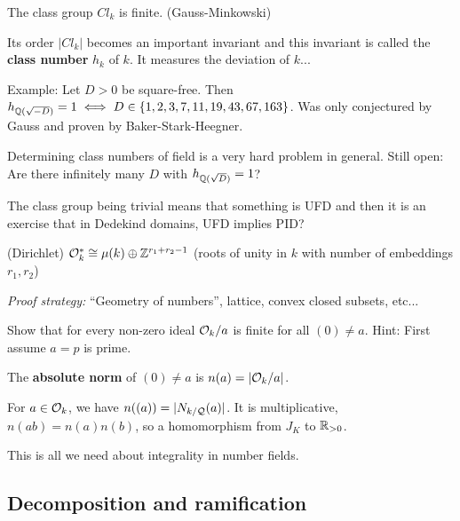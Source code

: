 \begin{outline}
\0 \begin{theorem}
    The class group $Cl_k$ is finite. (Gauss-Minkowski)
\end{theorem}

\1 Its order $|Cl_k|$ becomes an important invariant and this invariant is called the \textbf{class number} $h_k$ of $k$. It measures the deviation of $k$...

\1 Example: Let $D>0$ be square-free. Then $h_{\mathbb{Q}(\sqrt{-D})} = 1 \iff D\in \{1,2,3,7,11,19,43,67,163\}$. Was only conjectured by Gauss and proven by Baker-Stark-Heegner.

\1 Determining class numbers of field is a very hard problem in general. Still open: Are there infinitely many $D$ with $h_{\mathbb{Q}(\sqrt{D})}=1$? 

\1 The class group being trivial means that something is UFD and then it is an exercise that in Dedekind domains, UFD implies PID? 

\0 \begin{theorem}
    (Dirichlet) $\mathcal{O}^*_k \cong \mu(k)\oplus \mathbb{Z}^{r_1 + r_2 -1}$ (roots of unity in $k$ with number of embeddings $r_1,r_2$)
\end{theorem}
\textit{Proof strategy:} \enquote{Geometry of numbers}, lattice, convex closed subsets, etc...

\0 \begin{exercise}
    Show that for every non-zero ideal $\mathcal{O}_k /a$ is finite for all $(0)\neq a$. Hint: First assume $a=p$ is prime.
\end{exercise}

\0 \begin{definition}
    The \textbf{absolute norm} of $(0)\neq a$ is $n(a)=|\mathcal{O}_k /a|$.
\end{definition}

\0 \begin{exercise}
    For $a\in \mathcal{O}_k$, we have $n((a)) = |N_{k/\mathcal{Q}}(a)|$. It is multiplicative, $n(ab)=n(a)n(b)$, so a homomorphism from $J_K$ to $\mathbb{R}_{> 0}$.
\end{exercise}

This is all we need about integrality in number fields.
\end{outline}

\subsection{Decomposition and ramification}

